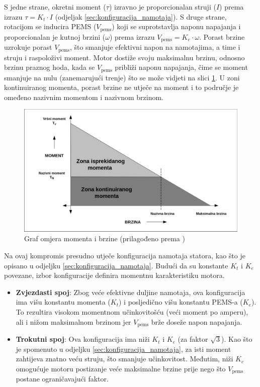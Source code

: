 \documentclass[diplomskirad, upload]{fer}
\begin{document}
S jedne strane, okretni moment ($\tau$) izravno je proporcionalan struji ($I$)
prema izrazu $\tau = K_t \cdot I$ (odjeljak \ref{sec:konfiguracija_namotaja}).
S druge strane, rotacijom se inducira PEMS ($V_{\text{pems}}$) koji se
suprotstavlja naponu napajanja i proporcionalan je kutnoj brzini ($\omega$)
prema izrazu $V_{\text{pems}} = K_e \cdot \omega$. Porast brzine uzrokuje
porast $V_{\text{pems}}$, što smanjuje efektivni napon na namotajima, a time i
struju i raspoloživi moment. Motor dostiže svoju maksimalnu brzinu, odnosno
brzinu praznog hoda, kada se $V_{\text{pems}}$ približi naponu napajanja, čime
se moment smanjuje na nulu (zanemarujući trenje) što se može vidjeti na slici
\ref{fig:torque_speed}. U zoni kontinuiranog momenta, porast brzine ne utječe
na moment i to područje je omeđeno nazivnim momentom i nazivnom brzinom.

\begin{figure}[h!]
	\centering
	\includegraphics[width=\textwidth]{Figures/microchip_torque_speed.png}
	\caption{Graf omjera momenta i brzine (prilagođeno prema \cite{MicrochipAN885})}
	\label{fig:torque_speed}
\end{figure}

Na ovaj kompromis presudno utječe konfiguracija namotaja statora, kao što je
opisano u odjeljku \ref{sec:konfiguracija_namotaja}. Budući da su konstante
$K_t$ i $K_e$ povezane, izbor konfiguracije definira momentnu karakteristiku
motora.

\begin{itemize}

	\item \textbf{Zvjezdasti spoj}: Zbog veće efektivne duljine namotaja, ova konfiguracija ima višu konstantu momenta ($K_t$) i posljedično višu konstantu PEMS-a ($K_e$). To rezultira visokom momentnom učinkovitošću (veći moment po amperu), ali i nižom maksimalnom brzinom jer $V_{\text{pems}}$ brže doseže napon napajanja.

	\item \textbf{Trokutni spoj}: Ova konfiguracija ima niži $K_t$ i $K_e$ (za faktor $\sqrt{3}$). Kao što je spomenuto u odjeljku \ref{sec:konfiguracija_namotaja}, za isti moment zahtijeva znatno veću struju, što smanjuje učinkovitost. Međutim, niži $K_e$ omogućuje motoru postizanje veće maksimalne brzine prije nego što $V_{\text{pems}}$ postane ograničavajući faktor.

\end{itemize}
\end{document}
